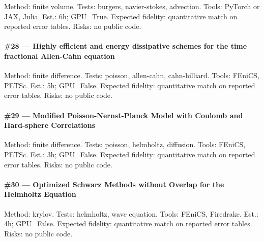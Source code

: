 \documentclass[10pt,letterpaper]{article}
\begin{document}
Method: finite volume. Tests: burgers, navier-stokes, advection. Tools: PyTorch or JAX, Julia. Est.: 6h; GPU=True. Expected fidelity: quantitative match on reported error tables. Risks: no public code.

\paragraph{\#28 — Highly efficient and energy dissipative schemes for the time fractional Allen-Cahn equation}

Method: finite difference. Tests: poisson, allen-cahn, cahn-hilliard. Tools: FEniCS, PETSc. Est.: 5h; GPU=False. Expected fidelity: quantitative match on reported error tables. Risks: no public code.

\paragraph{\#29 — Modified Poisson-Nernst-Planck Model with Coulomb and Hard-sphere Correlations}

Method: finite difference. Tests: poisson, helmholtz, diffusion. Tools: FEniCS, PETSc. Est.: 3h; GPU=False. Expected fidelity: quantitative match on reported error tables. Risks: no public code.

\paragraph{\#30 — Optimized Schwarz Methods without Overlap for the Helmholtz Equation}

Method: krylov. Tests: helmholtz, wave equation. Tools: FEniCS, Firedrake. Est.: 4h; GPU=False. Expected fidelity: quantitative match on reported error tables. Risks: no public code.
\end{document}

